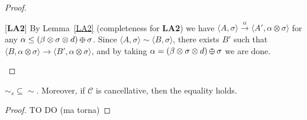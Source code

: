 \documentclass{llncs}
\def\odiv{\, {\ominus\hspace{-7.7pt} \div} \,}
\begin{document}
{\begin{proof}
\begin{description}
		\item{[{\bf LA2}]}
		By Lemma~\ref{LA2} (completeness for {\bf LA2}) we have $\langle A,  \sigma \rangle  \xrightarrow{\alpha}\langle A', \alpha \otimes \sigma \rangle$
		for any $\alpha \leq (\beta \otimes \sigma \otimes d) \odiv \sigma$.
		Since $\langle A,\sigma \rangle \sim \langle B,\sigma \rangle$, 
		there exists $B'$ such that 
		$\langle B, \alpha \otimes \sigma \rangle \xrightarrow{} \langle B', \alpha \otimes \sigma \rangle$,
		and by taking $\alpha = (\beta \otimes \sigma \otimes d) \odiv \sigma$ we are done.
	\end{description}
\end{proof}




\begin{theorem}
	$\sim_{\mathit{s}} \subseteq \sim$. Moreover, if $\mathcal{C}$ is cancellative, then the equality holds.
\end{theorem}
\begin{proof} 
	
	TO DO (ma torna)
\end{proof}
}
\end{document}

